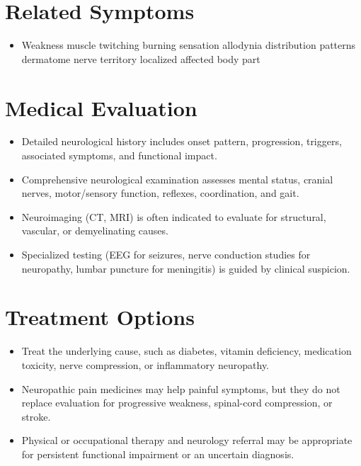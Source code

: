\section*{Related Symptoms}
\begin{itemize}
  \item Weakness muscle twitching burning sensation allodynia distribution patterns dermatome nerve territory localized affected body part
\end{itemize}

\section*{Medical Evaluation}
\begin{itemize}
  \item Detailed neurological history includes onset pattern, progression, triggers, associated symptoms, and functional impact.
  \item Comprehensive neurological examination assesses mental status, cranial nerves, motor/sensory function, reflexes, coordination, and gait.
  \item Neuroimaging (CT, MRI) is often indicated to evaluate for structural, vascular, or demyelinating causes.
  \item Specialized testing (EEG for seizures, nerve conduction studies for neuropathy, lumbar puncture for meningitis) is guided by clinical suspicion.
\end{itemize}

\section*{Treatment Options}
\begin{itemize}
  \item Treat the underlying cause, such as diabetes, vitamin deficiency, medication toxicity, nerve compression, or inflammatory neuropathy.
  \item Neuropathic pain medicines may help painful symptoms, but they do not replace evaluation for progressive weakness, spinal-cord compression, or stroke.
  \item Physical or occupational therapy and neurology referral may be appropriate for persistent functional impairment or an uncertain diagnosis.
\end{itemize}

